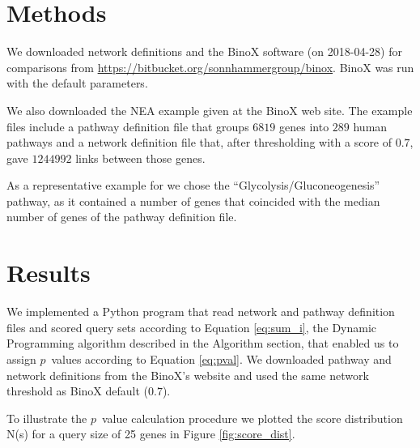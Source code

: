 \documentclass[a4paper,american]{lipics-v2016}
\begin{document}
\section*{Methods}

We downloaded network definitions and the BinoX software (on 2018-04-28) for comparisons from \url{https://bitbucket.org/sonnhammergroup/binox}. BinoX was run with the default parameters.

We also downloaded the NEA example given at the BinoX web site. The example files include a pathway definition file that groups $6819$ genes into $289$ human pathways and a network definition file that, after thresholding with a score of $0.7$, gave $1244992$ links between those genes.

As a representative example for we chose the ``Glycolysis/Gluconeogenesis'' pathway, as it contained a number of genes that coincided with the median number of genes of the pathway definition file.



\section*{Results}

We implemented a Python program that read network and pathway definition files and scored query sets according to Equation \ref{eq:sum_i}, the Dynamic Programming algorithm described in the Algorithm section, that enabled us to assign $p$~values according to Equation \ref{eq:pval}. We downloaded pathway and network definitions from the BinoX's website and used the same network threshold as BinoX default ($0.7$).

To illustrate the $p$~value calculation procedure we plotted the score distribution N(s) for a query size of 25 genes in Figure \ref{fig:score_dist}.
\end{document}
